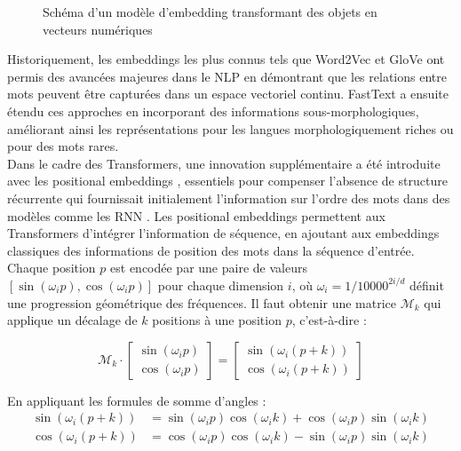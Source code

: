 \begin{figure}[H]    
    \centering
    
    \caption{Schéma d'un modèle d'embedding transformant des objets en vecteurs numériques}
    \label{fig:embedding_example}
\end{figure}

Historiquement, les embeddings les plus connus tels que Word2Vec \citep{mikolov2013distributed,mikolov2013efficient} et GloVe \citep{pennington2014glove} ont permis des avancées majeures dans le NLP en démontrant que les relations entre mots peuvent être capturées dans un espace vectoriel continu. FastText \citep{bojanowski2017enriching,joulin2017bag} a ensuite étendu ces approches en incorporant des informations sous-morphologiques, améliorant ainsi les représentations pour les langues morphologiquement riches ou pour des mots rares.\\

Dans le cadre des Transformers, une innovation supplémentaire a été introduite avec les positional embeddings \citep{vaswani2017attention}, essentiels pour compenser l'absence de structure récurrente qui fournissait initialement l'information sur l'ordre des mots dans des modèles comme les RNN \citep{hochreiter1997long,cho2014learning}. Les positional embeddings permettent aux Transformers d’intégrer l'information de séquence, en ajoutant aux embeddings classiques des informations de position des mots dans la séquence d'entrée. Chaque position $p$ est encodée par une paire de valeurs $[\sin(\omega_i p), \cos(\omega_i p)]$ pour chaque dimension $i$, où $\omega_i = 1 / 10000^{2i/d}$ \citep{vaswani2017attention} définit une progression géométrique des fréquences. Il faut obtenir une matrice $\mathcal{M}_k$ qui applique un décalage de $k$ positions à une position $p$, c'est-à-dire :

\begin{equation}
\mathcal{M}_k \cdot \begin{bmatrix} \sin(\omega_i p) \\ \cos(\omega_i p) \end{bmatrix} = \begin{bmatrix} \sin(\omega_i (p + k)) \\ \cos(\omega_i (p + k)) \end{bmatrix}
\end{equation}

En appliquant les formules de somme d'angles :
\begin{align*}
\sin(\omega_i(p + k)) &= \sin(\omega_i p)\cos(\omega_i k) + \cos(\omega_i p)\sin(\omega_i k) \\
\cos(\omega_i(p + k)) &= \cos(\omega_i p)\cos(\omega_i k) - \sin(\omega_i p)\sin(\omega_i k)
\end{align*}

